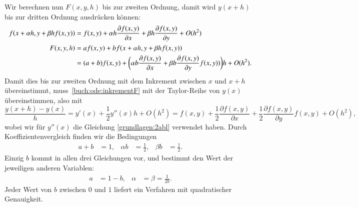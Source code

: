 Wir berechnen nun $F(x,y,h)$ bis zur zweiten Ordnung, damit wird 
$y(x+h)$ bis zur dritten Ordnung ausdrücken können:
\begin{align}
f(x+\alpha h, y + \beta h f(x,y))
&=
f(x,y)+\alpha h\frac{\partial f(x,y)}{\partial x}
+ \beta h \frac{\partial f(x,y)}{\partial y} + O(h^2)
\notag
\\
F(x,y,h)
&=
af(x,y) + bf(x+\alpha h, y + \beta h f(x,y))
\notag
\\
&=
(a+b)f(x,y) + \biggl(\alpha b\frac{\partial f(x,y)}{\partial x}
+ \beta b\frac{\partial f(x,y)}{\partial y} f(x,y))\biggr)h+O(h^2).
\label{buch:ode:inkrementF}
\end{align}
Damit dies bis zur zweiten Ordnung mit dem Inkrement zwischen $x$ und $x+h$
übereinstimmt, muss~\eqref{buch:ode:inkrementF} mit der Taylor-Reihe
von $y(x)$ übereinstimmen, also mit
\begin{equation}
\frac{y(x+h)-y(x)}{h}=y'(x) + \frac12y''(x)h + O(h^2)
=f(x,y) + \frac12\frac{\partial f(x,y)}{\partial x}
+\frac12\frac{\partial f(x,y)}{\partial y}f(x,y) + O(h^2),
\label{buch:ode:ytaylor}
\end{equation}
wobei wir für $y''(x)$ die Gleichung \eqref{grundlagen:2abl} verwendet haben.
Durch Koeffizientenvergleich finden wir die Bedingungen
\[
\begin{aligned}
a+b&=1,&
\alpha b&=\frac12,&
\beta b&=\frac12.
\end{aligned}
\]
Einzig $b$ kommt in allen drei Gleichungen vor, und bestimmt den Wert der
jeweiligen anderen Variablen:
\[
\begin{aligned}
a&=1-b,&\alpha&= \beta=\frac{1}{2b}.
\end{aligned}
\]
Jeder Wert von $b$ zwischen $0$ und $1$ liefert ein Verfahren mit quadratischer
Genauigkeit.

